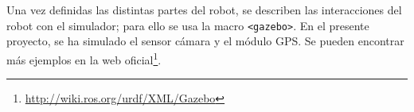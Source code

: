 

Una vez definidas las distintas partes del robot, se describen las interacciones del robot con el simulador; para ello se usa la macro \verb|<gazebo>|. En el presente proyecto, se ha simulado el sensor cámara y el módulo \acs{GPS}. Se pueden encontrar más ejemplos en la web oficial\footnote{\url{http://wiki.ros.org/urdf/XML/Gazebo}}.


